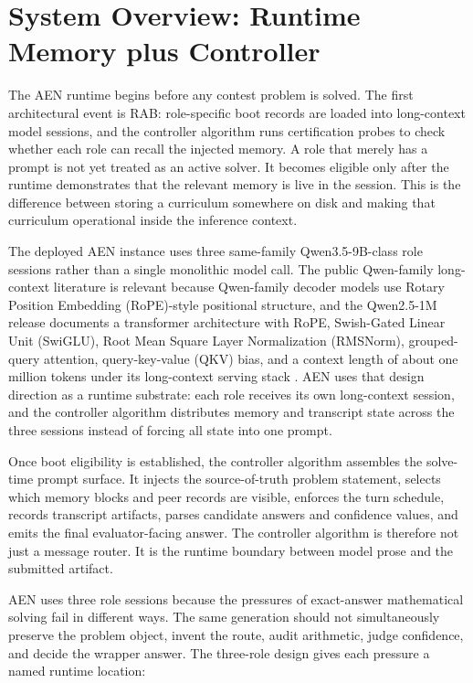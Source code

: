 \documentclass[11pt]{article}
\newcommand{\rab}{RAB}
\begin{document}
\clearpage

\section{System Overview: Runtime Memory plus Controller}

The AEN runtime begins before any contest problem is solved. The first architectural event is \rab{}: role-specific boot records are loaded into long-context model sessions, and the controller algorithm runs certification probes to check whether each role can recall the injected memory. A role that merely has a prompt is not yet treated as an active solver. It becomes eligible only after the runtime demonstrates that the relevant memory is live in the session. This is the difference between storing a curriculum somewhere on disk and making that curriculum operational inside the inference context.

The deployed AEN instance uses three same-family Qwen3.5-9B-class role sessions rather than a single monolithic model call. The public Qwen-family long-context literature is relevant because Qwen-family decoder models use Rotary Position Embedding (RoPE)-style positional structure, and the Qwen2.5-1M release documents a transformer architecture with RoPE, Swish-Gated Linear Unit (SwiGLU), Root Mean Square Layer Normalization (RMSNorm), grouped-query attention, query-key-value (QKV) bias, and a context length of about one million tokens under its long-context serving stack \citep{yang2025qwen25oneM,qwen2025qwen25oneMcard}. AEN uses that design direction as a runtime substrate: each role receives its own long-context session, and the controller algorithm distributes memory and transcript state across the three sessions instead of forcing all state into one prompt.

Once boot eligibility is established, the controller algorithm assembles the solve-time prompt surface. It injects the source-of-truth problem statement, selects which memory blocks and peer records are visible, enforces the turn schedule, records transcript artifacts, parses candidate answers and confidence values, and emits the final evaluator-facing answer. The controller algorithm is therefore not just a message router. It is the runtime boundary between model prose and the submitted artifact.

AEN uses three role sessions because the pressures of exact-answer mathematical solving fail in different ways. The same generation should not simultaneously preserve the problem object, invent the route, audit arithmetic, judge confidence, and decide the wrapper answer. The three-role design gives each pressure a named runtime location:
\end{document}
